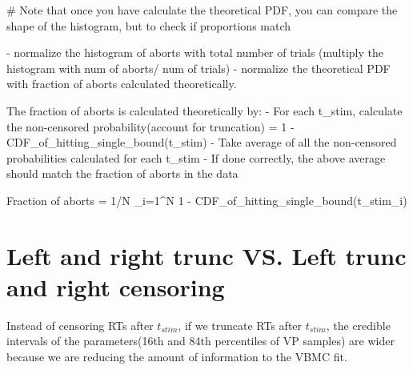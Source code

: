 # Note that once you have calculate the theoretical PDF, you can compare the shape of the histogram, 
but to check if proportions match

- normalize the histogram of aborts with total number of trials (multiply the histogram with num of aborts/ num of trials)
- normalize the theoretical PDF with fraction of aborts calculated theoretically. 

The fraction of aborts is calculated theoretically by:
- For each t_stim, calculate the non-censored probability(account for truncation) = 1 - CDF_of_hitting_single_bound(t_stim)
- Take average of all the non-censored probabilities calculated for each t_stim
- If done correctly, the above average should match the fraction of aborts in the data

Fraction of aborts = 1/N \Sigma_{i=1}^{N} 1 - CDF_of_hitting_single_bound(t_stim_i)   




\section{Left and right trunc VS. Left trunc and right censoring}
Instead of censoring RTs after $t_{stim}$, if we truncate RTs after $t_{stim}$, 
the credible intervals of the parameters(16th and 84th percentiles of VP samples) are wider because we are reducing the amount of 
information to the VBMC fit.

